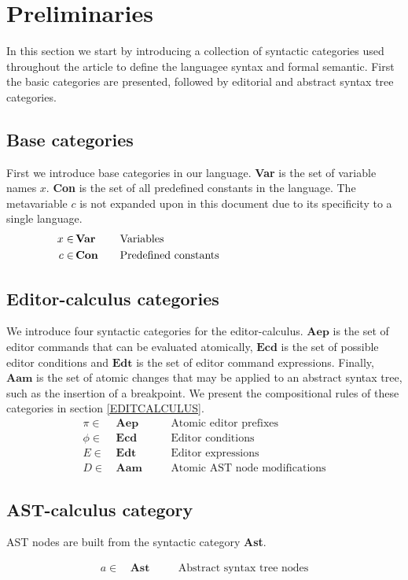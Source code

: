 \section{Preliminaries}
In this section we start by introducing a collection of syntactic categories used throughout the article to define the languagee syntax and formal semantic. First the basic categories are presented, followed by editorial and abstract syntax tree categories.
\subsection*{Base categories}
First we introduce base categories in our language. \textbf{Var} is the set of variable names $x$. \textbf{Con} is the set of all predefined constants in the language. The metavariable $c$ is not expanded upon in this document due to its specificity to a single language.
\begin{align*}
  x\in\, & \textbf{Var} && \quad \text{Variables}\\
  c \in\, & \textbf{Con} && \quad \text{Predefined constants\quad\quad\quad\quad\quad\quad\quad\quad\quad\quad\quad\quad}\\
\end{align*}
%
\subsection*{Editor-calculus categories}
We introduce four syntactic categories for the editor-calculus. $\mathbf{Aep}$ is the set of editor commands that can be evaluated atomically, $\mathbf{Ecd}$ is the set of possible editor conditions and $\mathbf{Edt}$ is the set of editor command expressions. Finally, $\mathbf{Aam}$ is the set of atomic changes that may be applied to an abstract syntax tree, such as the insertion of a breakpoint. We present the compositional rules of these categories in section \ref{EDITCALCULUS}.
\begin{align*}
  \pi \in\, & \textbf{Aep} && \quad \text{Atomic editor prefixes} \\
  \phi \in\, & \textbf{Ecd} && \quad \text{Editor conditions}\\
  E \in\, & \textbf{Edt} && \quad \text{Editor expressions} \\
  D \in\, & \textbf{Aam} && \quad \text{Atomic AST node modifications}
\end{align*}
%
\subsection*{AST-calculus category}
AST nodes are built from the syntactic category \textbf{Ast}. %


\begin{align*}
  a \in\, & \textbf{Ast} && \quad \text{Abstract syntax tree nodes}\\
\end{align*}
%